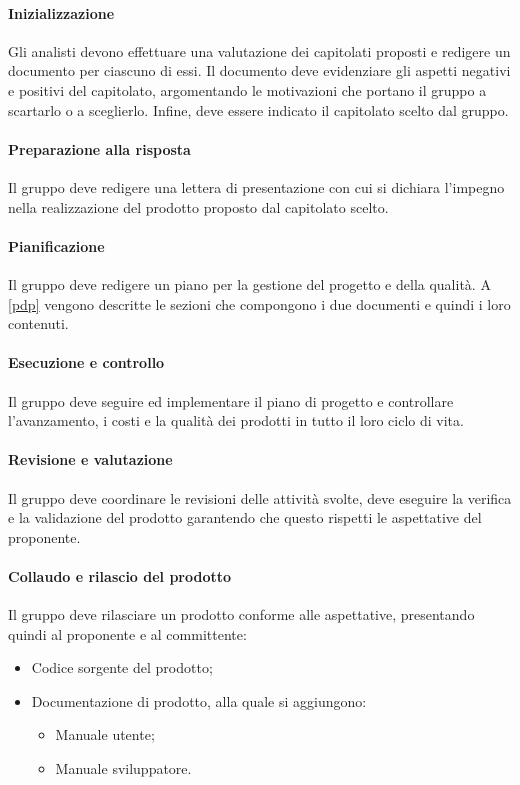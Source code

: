 \paragraph{Inizializzazione} 
Gli analisti devono effettuare una valutazione dei capitolati proposti e redigere un documento per ciascuno di essi. Il documento deve evidenziare gli aspetti negativi e positivi del capitolato, argomentando le motivazioni che portano il gruppo a scartarlo o a sceglierlo. Infine, deve essere indicato il capitolato scelto dal gruppo.

\paragraph{Preparazione alla risposta}
Il gruppo deve redigere una lettera di presentazione con cui si dichiara l'impegno nella realizzazione del prodotto proposto dal capitolato scelto.


\paragraph{Pianificazione}
Il gruppo deve redigere un piano per la gestione del progetto e della qualità. A \ref{pdp}  vengono descritte le sezioni che compongono i due documenti e quindi i loro contenuti.

\paragraph{Esecuzione e controllo}
Il gruppo deve seguire ed implementare il piano di progetto e controllare l'avanzamento, i costi e la qualità dei prodotti in tutto il loro ciclo di vita.

\paragraph{Revisione e valutazione}
Il gruppo deve coordinare le revisioni delle attività svolte, deve eseguire la verifica e la validazione del prodotto garantendo che questo rispetti le aspettative del proponente.

\paragraph{Collaudo e rilascio del prodotto}
Il gruppo deve rilasciare un prodotto conforme alle aspettative, presentando quindi al proponente e al committente:
\begin{itemize}
	\item Codice sorgente del prodotto;
	\item Documentazione di prodotto, alla quale si aggiungono: 
	\begin{itemize}
		\item Manuale utente;
		\item Manuale sviluppatore.
	\end{itemize}
\end{itemize}

